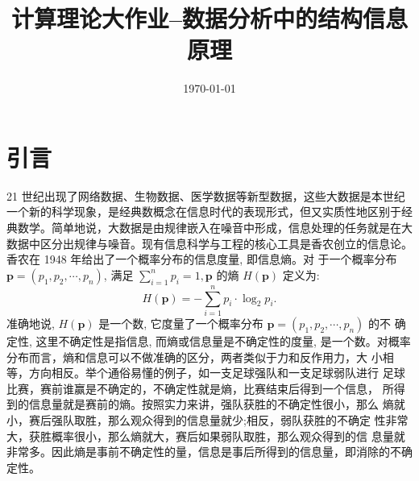\documentclass[a4paper]{apa6}
\date{\today}
\title{计算理论大作业--数据分析中的结构信息原理}
\begin{document}
\maketitle

\section{引言}
\label{sec:orgbb1ae0d}
21 世纪出现了网络数据、生物数据、医学数据等新型数据，这些大数据是本世纪一个新的科学现象，是经典数概念在信息时代的表现形式，但又实质性地区别于经典数学。简单地说，大数据是由规律嵌入在噪音中形成，信息处理的任务就是在大数据中区分出规律与噪音。现有信息科学与工程的核心工具是香农创立的信息论。香农在 1948 年给出了一个概率分布的信息度量, 即信息熵。对 于一个概率分布 \(\boldsymbol{p}=\left(p_{1}, p_{2}, \cdots, p_{n}\right)\), 满足 \(\sum_{i=1}^{n} p_{i}=1, \boldsymbol{p}\) 的熵 \(H(\boldsymbol{p})\) 定义为:
$$
H(\boldsymbol{p})=-\sum_{i=1}^{n} p_{i} \cdot \log _{2} p_{i} .
$$
准确地说, \(H(\boldsymbol{p})\) 是一个数, 它度量了一个概率分布 \(\boldsymbol{p}=\left(p_{1}, p_{2}, \cdots, p_{n}\right)\) 的不 确定性, 这里不确定性是指信息, 而熵或信息量是不确定性的度量, 是一个数。对概率分布而言，熵和信息可以不做准确的区分，两者类似于力和反作用力，大 小相等，方向相反。举个通俗易懂的例子，如一支足球强队和一支足球弱队进行 足球比赛，赛前谁赢是不确定的，不确定性就是熵，比赛结束后得到一个信息， 所得到的信息量就是赛前的熵。按照实力来讲，强队获胜的不确定性很小，那么 熵就小，赛后强队取胜，那么观众得到的信息量就少;相反，弱队获胜的不确定 性非常大，获胜概率很小，那么熵就大，赛后如果弱队取胜，那么观众得到的信 息量就非常多。因此熵是事前不确定性的量，信息是事后所得到的信息量，即消除的不确定性。
\end{document}
